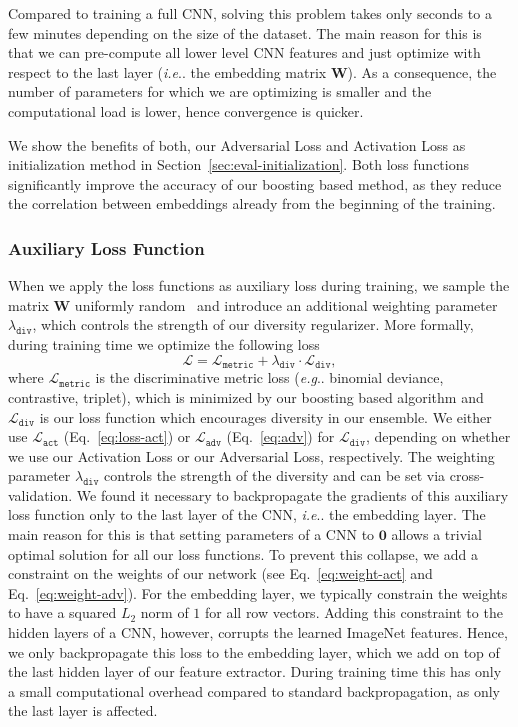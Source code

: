 \documentclass[10pt,journal,compsoc]{IEEEtran}
\makeatletter
\DeclareRobustCommand\onedot{\futurelet\@let@token\@onedot}
\def\@onedot{\ifx\@let@token.\else.\null\fi\xspace}
\def\eg{\emph{e.g}\onedot} \def\Eg{\emph{E.g}\onedot}
\def\ie{\emph{i.e}\onedot} \def\Ie{\emph{I.e}\onedot}
\makeatother
\begin{document}
Compared to training
a full \ac{CNN}, solving this problem takes only seconds to a few minutes depending
on the size of the dataset. The main reason for this is that we can pre-compute all
lower level \ac{CNN} features and just optimize with respect to the last layer
(\ie the embedding matrix $\boldsymbol{W}$). As a consequence, the number of
parameters for which we are optimizing is smaller and the computational load
is lower, hence convergence is quicker.

We show the benefits of both, our Adversarial Loss and Activation Loss as initialization method in Section~\ref{sec:eval-initialization}.
Both loss functions significantly improve the accuracy of our boosting based method, as they reduce the correlation between
embeddings already from the beginning of the training.

\subsubsection{Auxiliary Loss Function}\label{sec:method-auxiliary-loss}

When we apply the loss functions as auxiliary loss during training, we sample
the matrix $\boldsymbol{W}$ uniformly random~\cite{Glorot10} and introduce an additional
weighting parameter $\lambda_\texttt{div}$, which controls the strength of our diversity regularizer.
More formally, during training time we optimize the following loss
\begin{equation}
    \label{eq:training}
    \mathcal{L} = \mathcal{L}_{\texttt{metric}} + \lambda_{\texttt{div}} \cdot \mathcal{L}_{\texttt{div}}, 
\end{equation}
where $\mathcal{L}_{\texttt{metric}}$ is the discriminative metric loss (\eg binomial deviance, contrastive, triplet), which is minimized by our boosting based algorithm 
and $\mathcal{L}_{\texttt{div}}$ is 
our loss function which encourages diversity in our ensemble. We either use $\mathcal{L_{\texttt{act}}}$ (Eq.~\eqref{eq:loss-act}) or $\mathcal{L_{\texttt{adv}}}$ (Eq.~\eqref{eq:adv}) for $\mathcal{L_{\texttt{div}}}$, depending on whether we use our Activation Loss or our Adversarial Loss, respectively. The weighting parameter $\lambda_{\texttt{div}}$ controls the strength
of the diversity and can be set via cross-validation.
We found it necessary to backpropagate the gradients of this auxiliary loss function only to the last layer of the \ac{CNN}, \ie the embedding layer. 
The main reason for this is that setting parameters of a \ac{CNN} to $\textbf{0}$ allows a trivial optimal solution for all 
our loss functions. To prevent this collapse, we add a constraint on the weights of our network (see Eq.~\eqref{eq:weight-act} and Eq.~\eqref{eq:weight-adv}). For the embedding layer, we typically constrain 
the weights to have a squared $L_2$ norm of $1$ for
all row vectors. Adding this constraint to the hidden layers of a \ac{CNN}, however, corrupts the learned ImageNet features. 
Hence, we only backpropagate this loss to the embedding layer, which we add on top of the last hidden layer of our feature extractor.
During training time this has only a small computational overhead compared to standard backpropagation, as only the last layer is affected.
\end{document}
